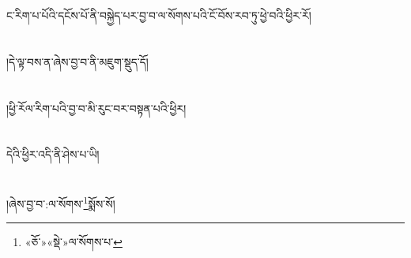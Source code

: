 ང་རིག་པ་པོའི་དངོས་པོ་ནི་བསྐྱེད་པར་བྱ་བ་ལ་སོགས་པའི་ངོ་བོས་རབ་ཏུ་ཕྱེ་བའི་ཕྱིར་རོ།\chapter{ }།དེ་ལྟ་བས་ན་ཞེས་བྱ་བ་ནི་མཇུག་སྡུད་དོ།\chapter{ }།ཕྱི་རོལ་རིག་པའི་བྱ་བ་མི་རུང་བར་བསྟན་པའི་ཕྱིར།\chapter{ }དེའི་ཕྱིར་འདི་ནི་ཤེས་པ་ཡི།\chapter{ }།ཞེས་བྱ་བ་:ལ་སོགས་\footnote{«ཅོ་»«སྡེ་»ལ་སོགས་པ་}སྨོས་སོ།\chapte